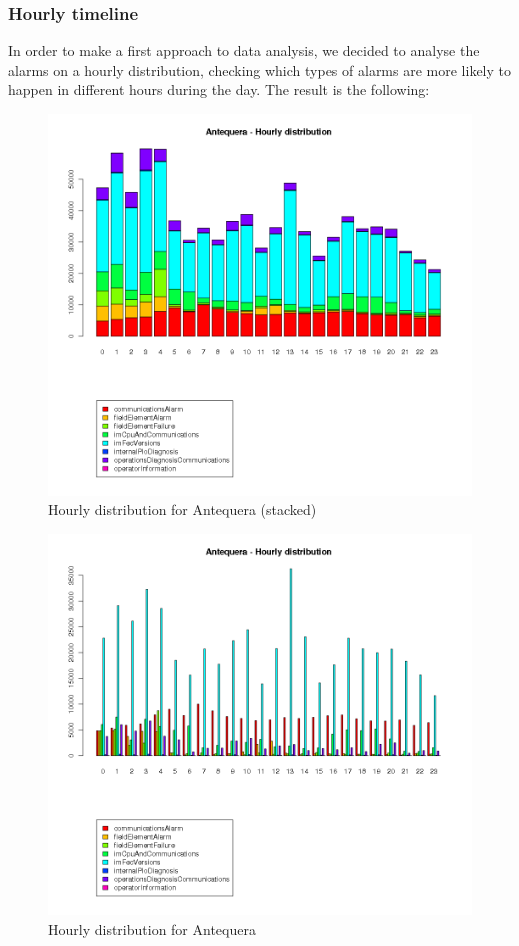 \documentclass[a4paper,10pt]{article}
\begin{document}
\subsubsection{Hourly timeline}

In order to make a first approach to data analysis, we decided to analyse the alarms on a hourly distribution, checking which types of alarms are more likely to happen in different hours during the day. The result is the following:

\clearpage

\begin{figure}[h!]
 \centering
 \includegraphics[height=0.4\textheight]{./img/antequera_timeline.png}
 \caption{Hourly distribution for Antequera (stacked)}
\end{figure}
\begin{figure}[h!]
 \centering
 \includegraphics[height=0.4\textheight]{./img/antequera_timeline_b.png}
 \caption{Hourly distribution for Antequera}
\end{figure}
\end{document}
